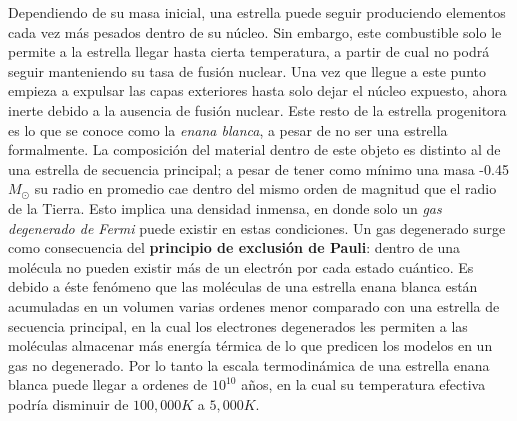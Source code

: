 Dependiendo de su masa inicial, una estrella puede seguir produciendo elementos
cada vez más pesados dentro de su núcleo. Sin embargo, este combustible solo le
permite a la estrella llegar hasta cierta temperatura, a partir de cual no podrá
seguir manteniendo su tasa de fusión nuclear. Una vez que llegue a este punto
empieza a expulsar las capas exteriores hasta solo dejar el núcleo expuesto,
ahora inerte debido a la ausencia de fusión nuclear. Este resto de la estrella
progenitora es lo que se conoce como la \textit{enana blanca}, a pesar de no ser
una estrella formalmente. La composición del material dentro de este objeto es
distinto al de una estrella de secuencia principal; a pesar de tener como mínimo
una masa -0.45 \(M_{\odot}\) su radio en promedio cae
dentro del mismo orden de magnitud que el radio de la Tierra.
\citet*{whiteDwarfsReview} Esto implica una densidad inmensa, en donde solo un
\textit{gas degenerado de Fermi} puede existir en estas condiciones. Un gas
degenerado surge como consecuencia del \textbf{principio de exclusión de Pauli}:
dentro de una molécula no pueden existir más de un electrón por cada estado
cuántico. Es debido a éste fenómeno que las moléculas de una estrella enana
blanca están acumuladas en un volumen varias ordenes menor comparado con una
estrella de secuencia principal, en la cual los electrones degenerados les
permiten a las moléculas almacenar más energía térmica de lo que predicen los
modelos en un gas no degenerado. Por lo tanto la escala termodinámica de una
estrella enana blanca puede llegar a ordenes de \textapproxtilde \(10^{10}\)
años, en la cual su temperatura efectiva podría disminuir de \(100,000 K\) a
\textapproxtilde \(5,000 K\). \citet*{whiteDwarfsReview}